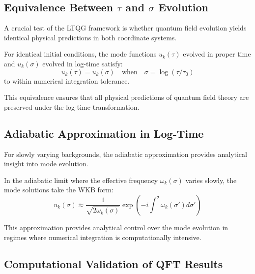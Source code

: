 \subsection[Equivalence Between tau and sigma Evolution]{Equivalence Between $\tau$ and $\sigma$ Evolution}
\label{subsec:tau_sigma_equivalence}

A crucial test of the LTQG framework is whether quantum field evolution yields identical physical predictions in both coordinate systems.

\begin{theorem}
\label{thm:mode_evolution_equivalence}
For identical initial conditions, the mode functions $u_k(\tau)$ evolved in proper time and $u_k(\sigma)$ evolved in log-time satisfy:
\begin{equation}
u_k(\tau) = u_k(\sigma) \quad \text{when} \quad \sigma = \log(\tau/\tau_0)
\end{equation}
to within numerical integration tolerance.
\end{theorem}

This equivalence ensures that all physical predictions of quantum field theory are preserved under the log-time transformation.

\subsection{Adiabatic Approximation in Log-Time}
\label{subsec:adiabatic_approximation}

For slowly varying backgrounds, the adiabatic approximation provides analytical insight into mode evolution.

\begin{theorem}
\label{thm:adiabatic_solutions}
In the adiabatic limit where the effective frequency $\omega_k(\sigma)$ varies slowly, the mode solutions take the WKB form:
\begin{equation}
u_k(\sigma) \approx \frac{1}{\sqrt{2\omega_k(\sigma)}} \exp\left( -i \int^{\sigma} \omega_k(\sigma') d\sigma' \right)
\label{eq:adiabatic_solution}
\end{equation}
\end{theorem}

This approximation provides analytical control over the mode evolution in regimes where numerical integration is computationally intensive.

\subsection{Computational Validation of QFT Results}
\label{subsec:qft_computational_validation}

